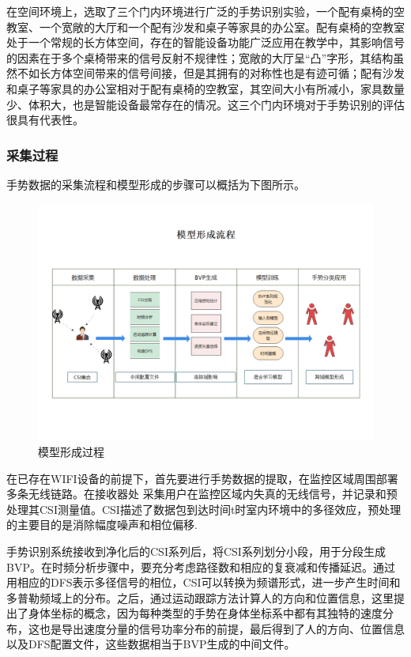 \documentclass[a4paper]{article}
\begin{document}
  在空间环境上，选取了三个门内环境进行广泛的手势识别实验，一个配有桌椅的空教室、一个宽敞的大厅和一个配有沙发和桌子等家具的办公室。配有桌椅的空教室处于一个常规的长方体空间，存在的智能设备功能广泛应用在教学中，其影响信号的因素在于多个桌椅带来的信号反射不规律性；宽敞的大厅呈“凸”字形，其结构虽然不如长方体空间带来的信号间接，但是其拥有的对称性也是有迹可循；配有沙发和桌子等家具的办公室相对于配有桌椅的空教室，其空间大小有所减小，家具数量少、体积大，也是智能设备最常存在的情况。这三个门内环境对于手势识别的评估很具有代表性。
  \subsubsection{采集过程}
  手势数据的采集流程和模型形成的步骤可以概括为下图所示。 \par
    \begin{figure}[H]
                \centering
                \includegraphics[width=16cm]{images/process.png}
                \caption{模型形成过程}
                \label{fig1}
              \end{figure}
  在已存在WIFI设备的前提下，首先要进行手势数据的提取，在监控区域周围部署多条无线链路。在接收器处
采集用户在监控区域内失真的无线信号，并记录和预处理其CSI测量值。CSI描述了数据包到达时间t时室内环境中的多径效应，预处理的主要目的是消除幅度噪声和相位偏移. \par
  手势识别系统接收到净化后的CSI系列后，将CSI系列划分小段，用于分段生成BVP。在时频分析步骤中，要充分考虑路径数和相应的复衰减和传播延迟。通过用相应的DFS表示多径信号的相位，CSI可以转换为频谱形式，进一步产生时间和多普勒频域上的分布。之后，通过运动跟踪方法计算人的方向和位置信息，这里提出了身体坐标的概念，因为每种类型的手势在身体坐标系中都有其独特的速度分布，这也是导出速度分量的信号功率分布的前提，最后得到了人的方向、位置信息以及DFS配置文件，这些数据相当于BVP生成的中间文件\citep{gesture2}。 \par
\end{document}
